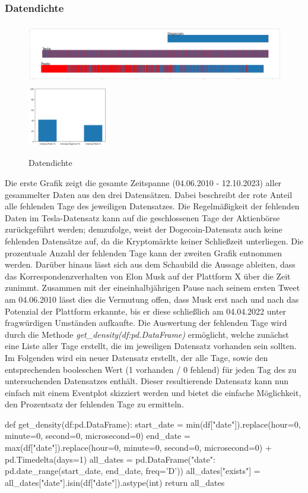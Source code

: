 \documentclass{article}
\begin{document}
\subsubsection{Datendichte}
\begin{figure}[!htb]
  	\includegraphics[width=.7\textwidth, height=100px]{../imgs/Dichte1.png}
	\includegraphics[width=.3\textwidth, height=100px]{../imgs/Dichte2.png}
 	\caption{Datendichte}
 	\label{fig:Datendichte}
\end{figure}
Die erste Grafik zeigt die gesamte Zeitspanne (04.06.2010 - 12.10.2023) aller gesammelter Daten aus den drei Datensätzen.
Dabei beschreibt der rote Anteil alle fehlenden Tage des jeweiligen Datensatzes.
Die Regelmäßigkeit der fehlenden Daten im Tesla-Datensatz kann auf die geschlossenen Tage der Aktienbörse zurückgeführt werden;
demzufolge, weist der Dogecoin-Datensatz auch keine fehlenden Datensätze auf, da die Kryptomärkte keiner Schließzeit unterliegen.
Die prozentuale Anzahl der fehlenden Tage kann der zweiten Grafik entnommen werden.
Darüber hinaus lässt sich aus dem Schaubild die Aussage ableiten, dass das Korrespondenzverhalten von Elon Musk auf der Plattform X über die Zeit zunimmt.
Zusammen mit der eineinhalbjährigen Pause nach seinem ersten Tweet am 04.06.2010 lässt dies die Vermutung offen, dass Musk erst nach und nach das Potenzial der Plattform erkannte, bis er diese schließlich am 04.04.2022 unter fragwürdigen Umständen aufkaufte. 
Die Auswertung der fehlenden Tage wird durch die Methode \textit{get\_density(df:pd.DataFrame)} ermöglicht, welche zunächst eine Liste aller Tage erstellt, die im jeweiligen Datensatz vorhanden sein sollten.
Im Folgenden wird ein neuer Datensatz erstellt, der alle Tage, sowie den entsprechenden booleschen Wert (1 vorhanden / 0 fehlend) für jeden Tag des zu untersuchenden Datensatzes enthält.
Dieser resultierende Datensatz kann nun einfach mit einem Eventplot skizziert werden und bietet die einfache Möglichkeit, den Prozentsatz der fehlenden Tage zu ermitteln.
\begin{python}
def get_density(df:pd.DataFrame):
    start_date = min(df["date"]).replace(hour=0, minute=0, second=0, microsecond=0)
    end_date = max(df["date"]).replace(hour=0, minute=0, second=0, microsecond=0) + pd.Timedelta(days=1)
    all_dates = pd.DataFrame({"date": pd.date_range(start_date, end_date, freq='D')})
    all_dates["exists"] = all_dates["date"].isin(df["date"]).astype(int)
    return all_dates
\end{python}
\end{document}
